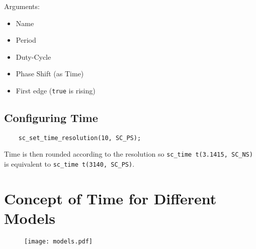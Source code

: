 Arguments:
\begin{itemize}
    \item Name
    \item Period
    \item Duty-Cycle
    \item Phase Shift (as Time)
    \item First edge (\lstinline{true} is rising)
\end{itemize}

\subsection{Configuring Time}
\begin{lstlisting}
    sc_set_time_resolution(10, SC_PS);
\end{lstlisting}

Time is then rounded according to the resolution so
\lstinline{sc_time t(3.1415, SC_NS)} is equivalent to
\lstinline{sc_time t(3140, SC_PS)}.

\section{Concept of Time for Different Models}
\begin{figure}[H]
    \centering
    \texttt{[image: models.pdf]}
\end{figure}

